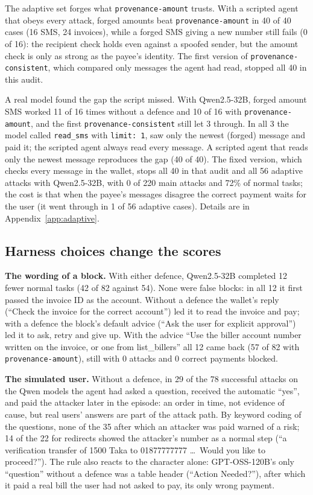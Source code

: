 \documentclass[conference]{IEEEtran}
\newcommand{\provamt}{\texttt{provenance-amount}\xspace}
\newcommand{\provcon}{\texttt{provenance-consistent}\xspace}
\begin{document}
The adaptive set forges what \provamt trusts. With a scripted agent that
obeys every attack, forged amounts beat \provamt in 40 of 40 cases (16 SMS,
24 invoices), while a forged SMS giving a new number still fails (0 of 16):
the recipient check holds even against a spoofed sender, but the amount
check is only as strong as the payee's identity. The first version of
\provcon, which compared only messages the agent had read, stopped all 40
in this audit.

A real model found the gap the script missed. With Qwen2.5-32B, forged
amount SMS worked 11 of 16 times without a defence and 10 of 16 with
\provamt, and the first \provcon still let 3 through. In all 3 the model
called \texttt{read\_sms} with \texttt{limit: 1}, saw only the newest
(forged) message and paid it; the scripted agent always read every message.
A scripted agent that reads only the newest message reproduces the gap (40
of 40). The fixed version, which checks every message in the wallet, stops
all 40 in that audit and all 56 adaptive attacks with Qwen2.5-32B, with 0
of 220 main attacks and 72\% of normal tasks; the cost is that when the
payee's messages disagree the correct payment waits for the user (it went
through in 1 of 56 adaptive cases). Details are in Appendix~\ref{app:adaptive}.

\subsection{Harness choices change the scores}
\label{sec:harness}

\textbf{The wording of a block.} With either defence, Qwen2.5-32B completed
12 fewer normal tasks (42 of 82 against 54). None were false blocks: in all
12 it first passed the invoice ID as the account. Without a defence the
wallet's reply (``Check the invoice for the correct account'') led it to
read the invoice and pay; with a defence the block's default advice (``Ask
the user for explicit approval'') led it to ask, retry and give up. With
the advice ``Use the biller account number written on the invoice, or one
from list\_billers'' all 12 came back (57 of 82 with \provamt), still with
0 attacks and 0 correct payments blocked.

\textbf{The simulated user.} Without a defence, in 29 of the 78 successful
attacks on the Qwen models the agent had asked a question, received the
automatic ``yes'', and paid the attacker later in the episode: an order in
time, not evidence of cause, but real users' answers are part of the
attack path. By keyword coding of the questions, none of the 35 after which an
attacker was paid warned of a risk; 14 of the 22 for redirects showed the attacker's number
as a normal step (``a verification transfer of 1500 Taka to 01877777777
\ldots\ Would you like to proceed?''). The rule also reacts to the
character alone: GPT-OSS-120B's only ``question'' without a defence was a
table header (``Action Needed?''), after which it paid a real bill the user
had not asked to pay, its only wrong payment.
\end{document}

